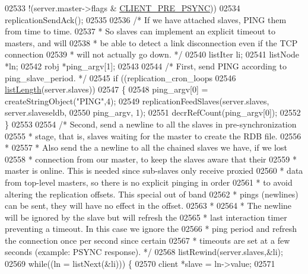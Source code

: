 \begin{DoxyCode}
{{{{{{{{{{{{{{{{{{{{{{{{{{{{{{{{{{{{{{{{{{{{{{{{{{{{{{{{{{{{{{{{{{{{{{{{{{{{02533         !(server.master->flags & \hyperlink{server_8h_ac13d62411270bd658f6d82e711e0f912}{CLIENT\_PRE\_PSYNC}))
02534         replicationSendAck();
02535 
02536     \textcolor{comment}{/* If we have attached slaves, PING them from time to time.}
02537 \textcolor{comment}{     * So slaves can implement an explicit timeout to masters, and will}
02538 \textcolor{comment}{     * be able to detect a link disconnection even if the TCP connection}
02539 \textcolor{comment}{     * will not actually go down. */}
02540     listIter li;
02541     listNode *ln;
02542     robj *ping\_argv[1];
02543 
02544     \textcolor{comment}{/* First, send PING according to ping\_slave\_period. */}
02545     \textcolor{keywordflow}{if} ((replication\_cron\_loops %
02546         \hyperlink{adlist_8h_afde0ab079f934670e82119b43120e94b}{listLength}(server.slaves))
02547     \{
02548         ping\_argv[0] = createStringObject(\textcolor{stringliteral}{"PING"},4);
02549         replicationFeedSlaves(server.slaves, server.slaveseldb,
02550             ping\_argv, 1);
02551         decrRefCount(ping\_argv[0]);
02552     \}
02553 
02554     \textcolor{comment}{/* Second, send a newline to all the slaves in pre-synchronization}
02555 \textcolor{comment}{     * stage, that is, slaves waiting for the master to create the RDB file.}
02556 \textcolor{comment}{     *}
02557 \textcolor{comment}{     * Also send the a newline to all the chained slaves we have, if we lost}
02558 \textcolor{comment}{     * connection from our master, to keep the slaves aware that their}
02559 \textcolor{comment}{     * master is online. This is needed since sub-slaves only receive proxied}
02560 \textcolor{comment}{     * data from top-level masters, so there is no explicit pinging in order}
02561 \textcolor{comment}{     * to avoid altering the replication offsets. This special out of band}
02562 \textcolor{comment}{     * pings (newlines) can be sent, they will have no effect in the offset.}
02563 \textcolor{comment}{     *}
02564 \textcolor{comment}{     * The newline will be ignored by the slave but will refresh the}
02565 \textcolor{comment}{     * last interaction timer preventing a timeout. In this case we ignore the}
02566 \textcolor{comment}{     * ping period and refresh the connection once per second since certain}
02567 \textcolor{comment}{     * timeouts are set at a few seconds (example: PSYNC response). */}
02568     listRewind(server.slaves,&li);
02569     \textcolor{keywordflow}{while}((ln = listNext(&li))) \{
02570         client *slave = ln->value;
02571 
}}}}}}}}}}}}}}}}}}}}}}}}}}}}}}}}}}}}}}}}}}}}}}}}}}}}}}}}}}}}}}}}}}}}}}}}}}}}
\end{DoxyCode}
